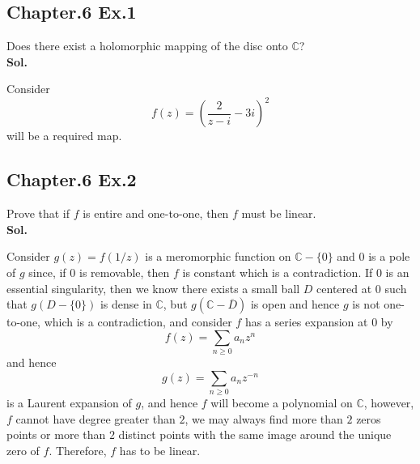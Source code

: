 \documentclass[lang=en,11pt,a4paper,citestyle =authoryear]{elegantpaper}
\newcommand{\C}{\mathbb{C}}
\begin{document}
\subsection*{Chapter.6 Ex.1} 
Does there exist a holomorphic mapping of the disc onto $\C$?
\vspace{0.5em}\\
\textbf{Sol.} \par
Consider
\[f(z) = (\dfrac{2}{z-i}-3i)^2\]
will be a required map.
\vspace{0.5em}

\subsection*{Chapter.6 Ex.2} 
Prove that if $f$ is entire and one-to-one, then $f$ must be linear.
\vspace{0.5em}\\
\textbf{Sol.} \par
Consider $g(z) = f(1/z)$ is a meromorphic function on $\C-\{0\}$ and $0$ is a pole of $g$ since, if $0$ is removable, then $f$ is constant which is a contradiction. If $0$ is an essential singularity, then we know there exists a small ball $D$ centered at $0$ such that $g(D-\{0\})$ is dense in $\C$, but $g(\C-\overline{D})$ is open and hence $g$ is not one-to-one, which is a contradiction, and consider $f$ has a series expansion at $0$ by
\[f(z) = \sum\limits_{n\geq 0} a_n z^n\]
and hence
\[
    g(z) = \sum\limits_{n\geq 0}a_n z^{-n}
\] 
is a Laurent expansion of $g$, and hence $f$ will become a polynomial on $\C$, however, $f$ cannot have degree greater than $2$, we may always find more than $2$ zeros points or more than $2$ distinct points with the same image around the unique zero of $f$. Therefore, $f$ has to be linear.
\vspace{0.5em}
\end{document}

